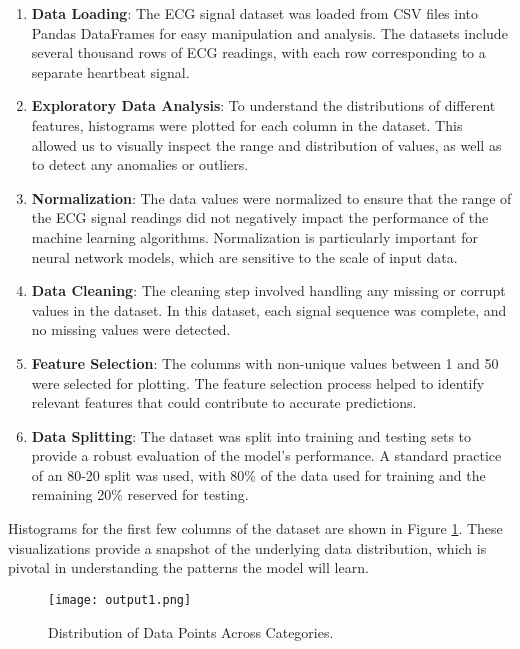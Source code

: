 \documentclass{report}
\begin{document}
\begin{enumerate}
    \item \textbf{Data Loading}: The ECG signal dataset was loaded from CSV files into Pandas DataFrames for easy manipulation and analysis. The datasets include several thousand rows of ECG readings, with each row corresponding to a separate heartbeat signal.
    \item \textbf{Exploratory Data Analysis}: To understand the distributions of different features, histograms were plotted for each column in the dataset. This allowed us to visually inspect the range and distribution of values, as well as to detect any anomalies or outliers.
    \item \textbf{Normalization}: The data values were normalized to ensure that the range of the ECG signal readings did not negatively impact the performance of the machine learning algorithms. Normalization is particularly important for neural network models, which are sensitive to the scale of input data.
    \item \textbf{Data Cleaning}: The cleaning step involved handling any missing or corrupt values in the dataset. In this dataset, each signal sequence was complete, and no missing values were detected.
    \item \textbf{Feature Selection}: The columns with non-unique values between 1 and 50 were selected for plotting. The feature selection process helped to identify relevant features that could contribute to accurate predictions.
    \item \textbf{Data Splitting}: The dataset was split into training and testing sets to provide a robust evaluation of the model's performance. A standard practice of an 80-20 split was used, with 80\% of the data used for training and the remaining 20\% reserved for testing.
\end{enumerate}

Histograms for the first few columns of the dataset are shown in Figure \ref{fig:histograms}. These visualizations provide a snapshot of the underlying data distribution, which is pivotal in understanding the patterns the model will learn.

\begin{figure}[ht]
    \centering
    \texttt{[image: output1.png]} %
    \caption{Distribution of Data Points Across Categories.}
    \label{fig:histograms}
\end{figure}
\end{document}
